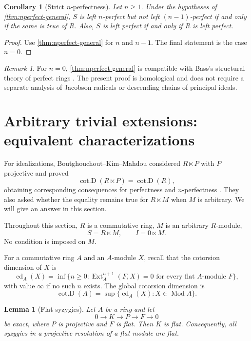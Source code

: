 \documentclass[11pt,reqno]{amsart}
\newcommand{\cd}{\operatorname{cd}}
\newcommand{\cotD}{\operatorname{cot.D}}
\newcommand{\Ext}{\operatorname{Ext}}
\newcommand{\Mod}{\operatorname{Mod}}
\theoremstyle{plain}
\newtheorem{lemma}[lemma]{Lemma}
\newtheorem{corollary}[corollary]{Corollary}
\theoremstyle{definition}
\theoremstyle{remark}
\newtheorem{remark}[remark]{Remark}
\begin{document}
\begin{corollary}[Strict $n$-perfectness]\label{cor:strict}
Let $n\ge1$.  Under the hypotheses of \cref{thm:nperfect-general}, $S$ is left
$n$-perfect but not left $(n-1)$-perfect if and only if the same is true of $R$.
Also, $S$ is left perfect if and only if $R$ is left perfect.
\end{corollary}

\begin{proof}
Use \cref{thm:nperfect-general} for $n$ and $n-1$.  The final statement is the case
$n=0$.
\end{proof}

\begin{remark}\label{rem:bass}
For $n=0$, \cref{thm:nperfect-general} is compatible with Bass's structural theory
of perfect rings \cite{Bass1960}.  The present proof is homological and does not
require a separate analysis of Jacobson radicals or descending chains of principal
ideals.
\end{remark}

\section{Arbitrary trivial extensions: equivalent characterizations}

For idealizations, Boutghouchout--Kim--Mahdou considered $R\ltimes P$ with
$P$ projective and proved
\[
\cotD(R\ltimes P)=\cotD(R),
\]
obtaining corresponding consequences for perfectness and $n$-perfectness
\cite{BoutghouchoutKimMahdou}.  They also asked whether the equality remains
true for $R\ltimes M$ when $M$ is arbitrary.
 We will give an answer in this section.

 Throughout this
section, $R$ is a commutative ring, $M$ is an arbitrary $R$-module,
\[
   S=R\ltimes M,
   \qquad I=0\ltimes M.
\]
No condition is imposed on $M$.

For a commutative ring $A$ and an $A$-module $X$, recall that the cotorsion
dimension of $X$ is
\[
  \cd_A(X)
  =\inf\bigl\{n\ge0:\Ext_A^{n+1}(F,X)=0
  \text{ for every flat }A\text{-module }F\bigr\},
\]
with value $\infty$ if no such $n$ exists.  The global cotorsion dimension is
\[
  \cotD(A)=\sup\{\cd_A(X):X\in\Mod A\}.
\]

\begin{lemma}[Flat syzygies]\label{lem:flat-syzygy}
Let $A$ be a ring and let
\[
 0\longrightarrow K\longrightarrow P\longrightarrow F\longrightarrow0
\]
be exact, where $P$ is projective and $F$ is flat.  Then $K$ is flat.  Consequently,
all syzygies in a projective resolution of a flat module are flat.
\end{lemma}
\end{document}
